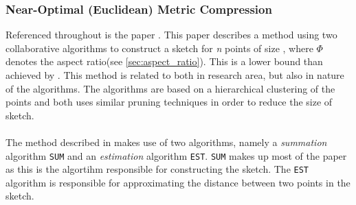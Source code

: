 \subsubsection{Near-Optimal (Euclidean) Metric Compression}
Referenced throughout \cite{wagner17} is the paper \cite{NearO}. This paper describes a method using two collaborative algorithms to construct a sketch for \textit{n} points of size , where $\Phi$ denotes the aspect ratio(see \ref{sec:aspect_ratio}). This is a lower bound than achieved by \qs{}. This method is related to \qs{} both in research area, but also in nature of the algorithms. The algorithms are based on a hierarchical clustering of the points and both uses similar pruning techniques in order to reduce the size of sketch.
\\
\\
The method described in \cite{NearO} makes use of two algorithms, namely a \textit{summation} algorithm \texttt{SUM} and an \textit{estimation} algorithm \texttt{EST}. \texttt{SUM} makes up most of the paper as this is the algortihm responsible for constructing the sketch. The \texttt{EST} algorithm is responsible for approximating the distance between two points in the sketch.

